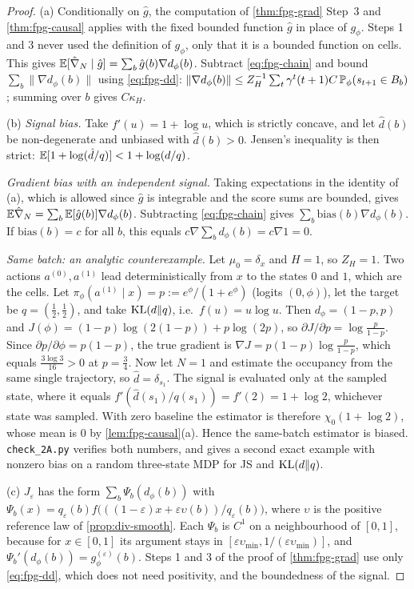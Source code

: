 \begin{proof}
(a) Conditionally on $\hat g$, the computation of \cref{thm:fpg-grad} Step~3 and \cref{thm:fpg-causal} applies with the fixed bounded function $\hat g$ in place of $g_\phi$.
Steps 1 and 3 never used the definition of $g_\phi$, only that it is a bounded function on cells.
This gives $\mathbb{E}[\hat\nabla_N\mid\hat g]=\sum_b\hat g(b)\nabla d_\phi(b)$.
Subtract \eqref{eq:fpg-chain} and bound $\sum_b\|\nabla d_\phi(b)\|$ using \eqref{eq:fpg-dd}:
$\|\nabla d_\phi(b)\|\le Z_H^{-1}\sum_t\gamma^t(t+1)C\,\mathbb{P}_\phi(s_{t+1}\in B_b)$; summing over $b$ gives $C\kappa_H$.

(b) \emph{Signal bias.} Take $f'(u)=1+\log u$, which is strictly concave, and let $\hat d(b)$ be non-degenerate and unbiased with $\hat d(b)>0$. Jensen's inequality is then strict: $\mathbb{E}[1+\log(\hat d/q)]<1+\log(d/q)$.

\emph{Gradient bias with an independent signal.} Taking expectations in the identity of (a), which is allowed since $\hat g$ is integrable and the score sums are bounded, gives $\mathbb{E}\hat\nabla_N=\sum_b\mathbb{E}[\hat g(b)]\nabla d_\phi(b)$.
Subtracting \eqref{eq:fpg-chain} gives $\sum_b\mathrm{bias}(b)\nabla d_\phi(b)$.
If $\mathrm{bias}(b)=c$ for all $b$, this equals $c\nabla\sum_bd_\phi(b)=c\nabla1=0$.

\emph{Same batch: an analytic counterexample.}
Let $\mu_0=\delta_x$ and $H=1$, so $Z_H=1$.
Two actions $a^{(0)},a^{(1)}$ lead deterministically from $x$ to the states $0$ and $1$, which are the cells.
Let $\pi_\phi(a^{(1)}\mid x)=p:=e^\phi/(1+e^\phi)$ (logits $(0,\phi)$), let the target be $q=(\frac12,\frac12)$, and take $\mathrm{KL}(d\Vert q)$, i.e.\ $f(u)=u\log u$.
Then $d_\phi=(1-p,p)$ and $J(\phi)=(1-p)\log(2(1-p))+p\log(2p)$, so $\partial J/\partial p=\log\frac p{1-p}$.
Since $\partial p/\partial\phi=p(1-p)$, the true gradient is $\nabla J=p(1-p)\log\frac p{1-p}$, which equals $\frac{3\log3}{16}>0$ at $p=\frac34$.
Now let $N=1$ and estimate the occupancy from the same single trajectory, so $\hat d=\delta_{s_1}$.
The signal is evaluated only at the sampled state, where it equals $f'(\hat d(s_1)/q(s_1))=f'(2)=1+\log2$, whichever state was sampled.
With zero baseline the estimator is therefore $\chi_0(1+\log2)$, whose mean is $0$ by \cref{lem:fpg-causal}(a).
Hence the same-batch estimator is biased.
\texttt{check\_2A.py} verifies both numbers, and gives a second exact example with nonzero bias on a random three-state MDP for JS and $\mathrm{KL}(d\Vert q)$.

(c) $J_\varepsilon$ has the form $\sum_b\Psi_b(d_\phi(b))$ with $\Psi_b(x)=q_\varepsilon(b)f\big(((1-\varepsilon)x+\varepsilon\upsilon(b))/q_\varepsilon(b)\big)$, where $\upsilon$ is the positive reference law of \cref{prop:div-smooth}.
Each $\Psi_b$ is $C^1$ on a neighbourhood of $[0,1]$, because for $x\in[0,1]$ its argument stays in $[\varepsilon\upsilon_{\min},1/(\varepsilon\upsilon_{\min})]$, and $\Psi_b'(d_\phi(b))=g^{(\varepsilon)}_\phi(b)$.
Steps 1 and 3 of the proof of \cref{thm:fpg-grad} use only \eqref{eq:fpg-dd}, which does not need positivity, and the boundedness of the signal.


\end{proof}
